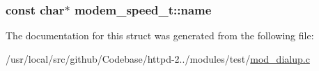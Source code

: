 \subsubsection[{\texorpdfstring{name}{name}}]{\setlength{\rightskip}{0pt plus 5cm}const char$\ast$ modem\+\_\+speed\+\_\+t\+::name}\hypertarget{structmodem__speed__t_ac22fb06455dd0bf6ffc512adaab9679c}{}\label{structmodem__speed__t_ac22fb06455dd0bf6ffc512adaab9679c}


The documentation for this struct was generated from the following file\+:\begin{DoxyCompactItemize}
\item 
/usr/local/src/github/\+Codebase/httpd-\/2../modules/test/\hyperlink{mod__dialup_8c}{mod\+\_\+dialup.\+c}\end{DoxyCompactItemize}
